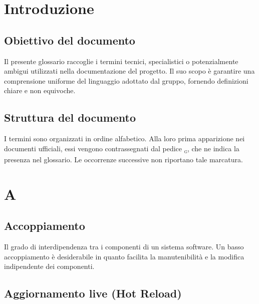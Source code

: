 \documentclass[a4paper, 11pt, oneside]{scrartcl} %
\begin{document}


\section{Introduzione}

\subsection{Obiettivo del documento}
Il presente glossario raccoglie i termini tecnici, specialistici o potenzialmente ambigui utilizzati nella documentazione del progetto.
Il suo scopo è garantire una comprensione uniforme del linguaggio adottato dal gruppo, fornendo definizioni chiare e non equivoche.
\subsection{Struttura del documento}
I termini sono organizzati in ordine alfabetico.
Alla loro prima apparizione nei documenti ufficiali, essi vengono contrassegnati dal pedice \textsubscript{\textsc{g}}, che ne indica la presenza nel glossario.
Le occorrenze successive non riportano tale marcatura.

\newpage
\appendix


\section*{A}


\subsection*{Accoppiamento}


Il grado di interdipendenza tra i componenti di un sistema software. Un basso accoppiamento è desiderabile in quanto facilita la manutenibilità e la modifica indipendente dei componenti.

\vspace{0.5cm}

\subsection*{Aggiornamento live (Hot Reload)}
\end{document}

